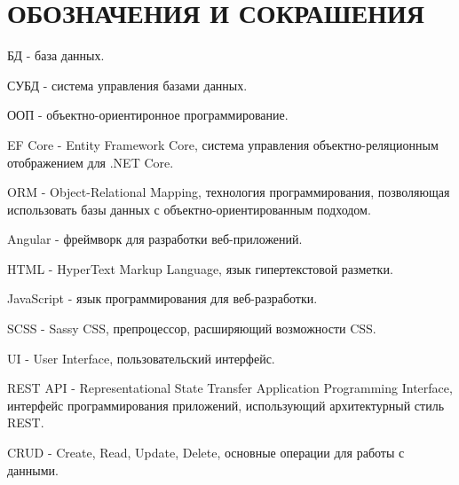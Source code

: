 \section*{ОБОЗНАЧЕНИЯ И СОКРАШЕНИЯ}

БД -\- база данных.

СУБД -\- система управления базами данных.

ООП -\- объектно-ориентиронное программирование.

EF Core -\- Entity Framework Core, система управления объектно-реляционным отображением для .NET Core.

ORM -\- Object-Relational Mapping, технология программирования, позволяющая использовать базы данных с объектно-ориентированным подходом.

Angular -\- фреймворк для разработки веб-приложений.

HTML -\- HyperText Markup Language, язык гипертекстовой разметки.

JavaScript -\- язык программирования для веб-разработки.

SCSS -\- Sassy CSS, препроцессор, расширяющий возможности CSS.

UI -\- User Interface, пользовательский интерфейс.

REST API -\- Representational State Transfer Application Programming Interface, интерфейс программирования приложений, использующий архитектурный стиль REST.

CRUD -\- Create, Read, Update, Delete, основные операции для работы с данными.

